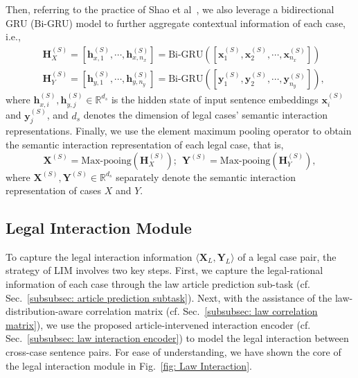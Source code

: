 Then, referring to the practice of Shao et al~\cite{shao2020Bert_PLI}, we also leverage a bidirectional GRU (Bi-GRU) model to further aggregate contextual information of each case, i.e., 
\begin{equation} \label{eq: Semantic RNN}
\begin{split}
& \mathbf{H}_{X}^{(S)} = [\mathbf{h}_{x, 1}^{(S)}, \cdots, \mathbf{h}_{x, n_x}^{(S)}] = \text{Bi-GRU}([\mathbf{x}_1^{(S)}, \mathbf{x}_2^{(S)}, \cdots, \mathbf{x}_{n_x}^{(S)}]) \\ 
& \mathbf{H}_{Y}^{(S)} = [\mathbf{h}_{y, 1}^{(S)}, \cdots, \mathbf{h}_{y, n_y}^{(S)}] = \text{Bi-GRU}([\mathbf{y}_1^{(S)}, \mathbf{y}_2^{(S)}, \cdots, \mathbf{y}_{n_y}^{(S)}]),
\end{split}
\end{equation}
where $\mathbf{h}_{x, i}^{(S)}, \mathbf{h}_{y, j}^{(S)} \in \mathbb{R}^{d_s}$ is the hidden state of input sentence embeddings $\mathbf{x}_i^{(S)}$ and $\mathbf{y}_j^{(S)}$, and $d_s$ denotes the dimension of legal cases' semantic interaction representations.
Finally, we use the element maximum pooling operator to obtain the semantic interaction representation of each legal case, that is,
\begin{equation} \label{eq: Semantic Representation}
\mathbf{X}^{(S)} = \text{Max-pooing}(\mathbf{H}_{X}^{(S)});
\ \ 
\mathbf{Y}^{(S)} = \text{Max-pooing}(\mathbf{H}_{Y}^{(S)}),
\end{equation}
where $\mathbf{X}^{(S)}, \mathbf{Y}^{(S)} \in \mathbb{R}^{d_s}$ separately denote the semantic interaction representation of cases $X$ and $Y$.

\subsection{Legal Interaction Module}
To capture the legal interaction information $\langle \mathbf{X}_L, \mathbf{Y}_L \rangle$ of a legal case pair, the strategy of LIM involves two key steps. First, we capture the legal-rational information of each case through the law article prediction sub-task (cf. Sec.~\ref{subsubsec: article prediction subtask}).
Next, with the assistance of the law-distribution-aware correlation matrix (cf. Sec.~\ref{subsubsec: law correlation matrix}), we use the proposed article-intervened interaction encoder (cf. Sec.~\ref{subsubsec: law interaction encoder}) to model the legal interaction between cross-case sentence pairs.
For ease of understanding, we have shown the core of the legal interaction module in Fig.~\ref{fig: Law Interaction}.

